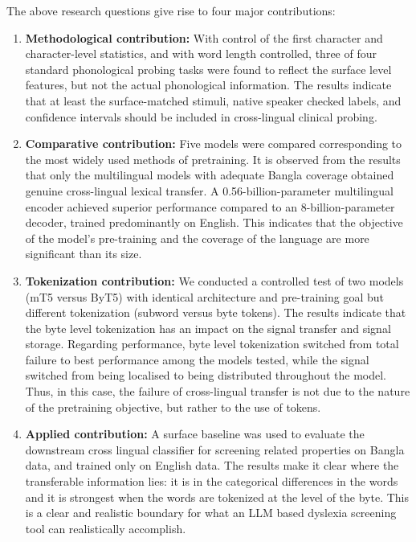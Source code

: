 \documentclass[preprint,12pt,authoryear]{elsarticle}
\begin{document}
The above research questions give rise to four major contributions:
\begin{enumerate}
\item \textbf{Methodological contribution:} With control of the first character and character-level statistics, and with word length controlled, three of four standard phonological probing tasks were found to reflect the surface level features, but not the actual phonological information. The results indicate that at least the surface-matched stimuli, native speaker checked labels, and confidence intervals should be included in cross-lingual clinical probing.
\item \textbf{Comparative contribution:} Five models were compared corresponding to the most widely used methods of pretraining. It is observed from the results that only the multilingual models with adequate Bangla coverage obtained genuine cross-lingual lexical transfer. A 0.56-billion-parameter multilingual encoder achieved superior performance compared to an 8-billion-parameter decoder, trained predominantly on English. This indicates that the objective of the model's pre-training and the coverage of the language are more significant than its size.
\item \textbf{Tokenization contribution:} We conducted a controlled test of two models (mT5 versus ByT5) with identical architecture and pre-training goal but different tokenization (subword versus byte tokens). The results indicate that the byte level tokenization has an impact on the signal transfer and signal storage. Regarding performance, byte level tokenization switched from total failure to best performance among the models tested, while the signal switched from being localised to being distributed throughout the model. Thus, in this case, the failure of cross-lingual transfer is not due to the nature of the pretraining objective, but rather to the use of tokens.
\item \textbf{Applied contribution:} A surface baseline was used to evaluate the downstream cross lingual classifier for screening related properties on Bangla data, and trained only on English data. The results make it clear where the transferable information lies: it is in the categorical differences in the words and it is strongest when the words are tokenized at the level of the byte. This is a clear and realistic boundary for what an LLM based dyslexia screening tool can realistically accomplish.
\end{enumerate}

\end{document}
